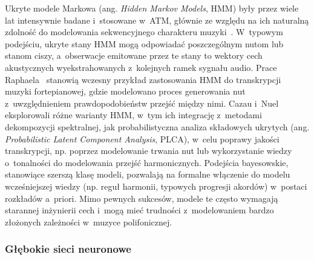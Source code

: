 Ukryte modele Markowa (ang. \textit{Hidden Markov Models}, HMM) były przez wiele lat intensywnie badane i~stosowane w~ATM, głównie ze względu na ich naturalną zdolność do modelowania sekwencyjnego charakteru muzyki~\autocite{KlapuriDavy2006SignalProcessing,Cazau2017HMM,Raphael2002PianoTranscription}. W~typowym podejściu, ukryte stany HMM mogą odpowiadać poszczególnym nutom lub stanom ciszy, a~obserwacje emitowane przez te stany to wektory cech akustycznych wyekstrahowanych z~kolejnych ramek sygnału audio. Prace Raphaela~\autocite{Raphael2002PianoTranscription} stanowią wczesny przykład zastosowania HMM do transkrypcji muzyki fortepianowej, gdzie modelowano proces generowania nut z~uwzględnieniem prawdopodobieństw przejść między nimi. Cazau i~Nuel~\autocite{Cazau2017HMM} eksplorowali różne warianty HMM, w~tym ich integrację z~metodami dekompozycji spektralnej, jak probabilistyczna analiza składowych ukrytych (ang. \textit{Probabilistic Latent Component Analysis}, PLCA), w~celu poprawy jakości transkrypcji, np. poprzez modelowanie trwania nut lub wykorzystanie wiedzy o~tonalności do modelowania przejść harmonicznych. Podejścia bayesowskie, stanowiące szerszą klasę modeli, pozwalają na formalne włączenie do modelu wcześniejszej wiedzy (np. reguł harmonii, typowych progresji akordów) w~postaci rozkładów a~priori. Mimo pewnych sukcesów, modele te często wymagają starannej inżynierii cech i~mogą mieć trudności z~modelowaniem bardzo złożonych zależności w~muzyce polifonicznej.

\subsubsection{Głębokie sieci neuronowe}
\label{sssec:deep_learning_atm}

